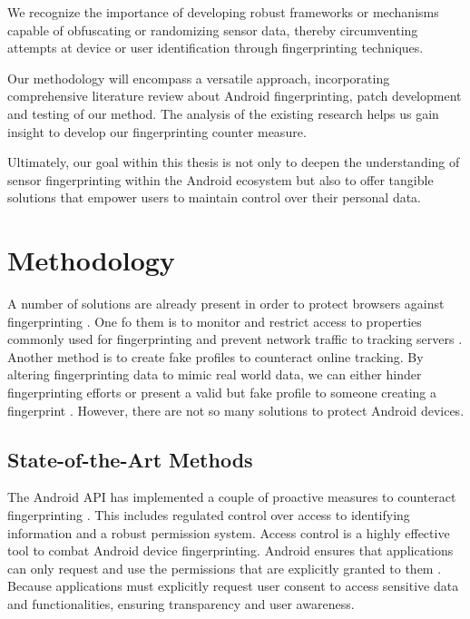 \documentclass[11pt,
  oneside,openany,    %
]{scrreprt}
\begin{document}
We recognize the importance of developing robust frameworks or mechanisms capable of obfuscating or randomizing sensor data, thereby circumventing attempts at device or user identification through fingerprinting techniques. 

Our methodology will encompass a versatile approach, incorporating comprehensive literature review about Android fingerprinting, patch development and testing of our method.
The analysis of the existing research helps us gain insight to develop our  fingerprinting counter measure.

Ultimately, our goal within this thesis is not only to deepen the understanding of sensor fingerprinting within the Android ecosystem but also to offer tangible solutions that empower users to maintain control over their personal data. 


\chapter{Methodology}
\label{chap:methodology}
A number of solutions are already present in order to protect browsers against fingerprinting \cite{polvcak2022jshelter, faizkhademi2015fpguard, nikiforakis2015privaricator, torres2015fp}. 
One fo them is to monitor and restrict access to properties commonly used for fingerprinting and prevent network traffic to tracking servers \cite{polvcak2022jshelter}. 
Another method is to create fake profiles to counteract online tracking. 
By altering fingerprinting data to mimic real world data, we can either hinder fingerprinting efforts or present a valid but fake profile to someone creating a fingerprint \cite{fiore2014countering}.
However, there are not so many solutions to protect Android devices.

\section{State-of-the-Art Methods}
\label{par:state-of-the-art}
The Android API has implemented a couple of proactive measures to counteract fingerprinting \cite{android_privacy_10}.
This includes regulated control over access to identifying information and a robust permission system. 
Access control is a highly effective tool to combat Android device fingerprinting.
Android ensures that applications can only request and use the permissions that are explicitly granted to them \cite{android_privacy_11}.
Because applications must explicitly request user consent to access sensitive data and functionalities, ensuring transparency and user awareness. 
\end{document}
